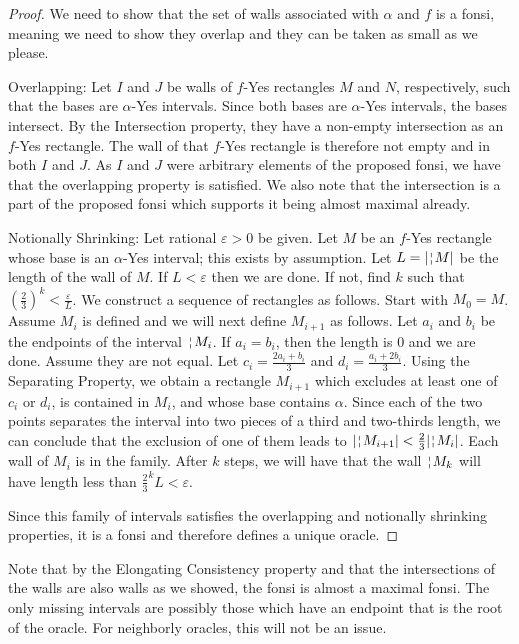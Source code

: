 \documentclass[12pt]{article}
\begin{document}
\begin{proof}
We need to show that the set of walls associated with $\alpha$ and $f$ is a fonsi, meaning we need to show they overlap and they can be taken as small as we please.

Overlapping: Let $I$ and $J$ be walls of $f$-Yes rectangles $M$ and $N$, respectively, such that the bases are $\alpha$-Yes intervals. Since both bases are $\alpha$-Yes intervals, the bases intersect. By the Intersection property, they have a non-empty intersection as an $f$-Yes rectangle. The wall of that $f$-Yes rectangle is therefore not empty and in both $I$ and $J$. As $I$ and $J$ were arbitrary elements of the proposed fonsi, we have that the overlapping property is satisfied. We also note that the intersection is a part of the proposed fonsi which supports it being almost maximal already. 

Notionally Shrinking: Let rational $\varepsilon > 0$ be given. Let $M$ be an $f$-Yes rectangle whose base is an $\alpha$-Yes interval; this exists by assumption. Let $L = |\wall{M}|$ be the length of the wall of $M$. If $L < \varepsilon$ then we are done. If not, find $k$ such that $(\frac{2}{3})^k < \frac{\varepsilon}{L}$. We construct a sequence of rectangles as follows. Start with $M_0= M$. Assume $M_i$ is defined and we will next define $M_{i+1}$ as follows. Let $a_i$ and $b_i$ be the endpoints of the interval  $\wall{M_i}$. If $a_i=b_i$, then the length is 0 and we are done. Assume they are not equal. Let $c_i =\frac{2a_i + b_i}{3}$ and $d_i = \frac{a_i +2b_i}{3}$. Using the Separating Property, we obtain a rectangle $M_{i+1}$ which excludes at least one of $c_i$ or $d_i$, is contained in $M_i$, and whose base contains $\alpha$. Since each of the two points separates the interval into two pieces of a third and two-thirds length, we can conclude that the exclusion of one of them leads to $|\wall{M_{i+1}}| < \frac{2}{3} |\wall{M_i}|$. Each wall of $M_i$ is in the family. After $k$ steps, we will have that the wall $\wall{M_k}$ will have length less than $\frac{2}{3}^k L < \varepsilon $.  

Since this family of intervals satisfies the overlapping and notionally shrinking properties, it is a fonsi and therefore defines a unique oracle. 
\end{proof}

Note that by the Elongating Consistency property and that the intersections of the walls are also walls as we showed, the fonsi is almost a maximal fonsi. The only missing intervals are possibly those which have an endpoint that is the root of the oracle. For neighborly oracles, this will not be an issue. 
\end{document}
